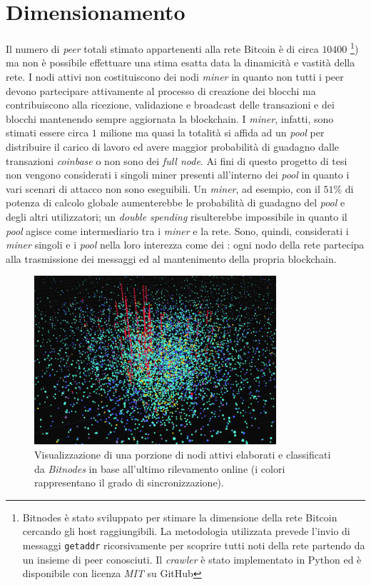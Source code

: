 \section{Dimensionamento}
Il numero di \textit{peer} totali stimato appartenenti alla rete Bitcoin è di circa $10400$ \cite{bitnodes}\footnote{Bitnodes è stato sviluppato per stimare la dimensione della rete Bitcoin cercando gli host raggiungibili. La metodologia utilizzata prevede l'invio di messaggi \texttt{getaddr} ricorsivamente per scoprire tutti noti della rete partendo da un insieme di peer conosciuti. Il \textit{crawler} è stato implementato in Python ed è disponibile con licenza \textit{MIT} su GitHub}) ma non è possibile effettuare una stima esatta data la dinamicità e vastità della rete. I nodi attivi non costituiscono dei nodi \textit{miner} in quanto non tutti i peer devono partecipare attivamente al processo di creazione dei blocchi ma contribuiscono alla ricezione, validazione e broadcast delle transazioni e dei blocchi mantenendo sempre aggiornata la blockchain. I \textit{miner}, infatti, sono stimati essere circa $1$ milione ma quasi la totalità si affida ad un \textit{pool} per distribuire il carico di lavoro ed avere maggior probabilità di guadagno dalle transazioni \textit{coinbase} o non sono dei \textit{full node}.\newline
Ai fini di questo progetto di tesi non vengono considerati i singoli miner presenti all'interno dei \textit{pool} in quanto i vari scenari di attacco non sono eseguibili. Un \textit{miner}, ad esempio, con il $51\%$ di potenza di calcolo globale aumenterebbe le probabilità di guadagno del \textit{pool} e degli altri utilizzatori; un \textit{double spending} risulterebbe impossibile in quanto il \textit{pool} agisce come intermediario tra i \textit{miner} e la rete.\newline
Sono, quindi, considerati i \textit{miner} singoli e i \textit{pool} nella loro interezza come dei : ogni nodo della rete partecipa alla trasmissione dei messaggi ed al mantenimento della propria blockchain.
\begin{figure}[H]
    \centering
    \includegraphics[width=0.8\textwidth]{images/bitnodes.png}
    \caption{Visualizzazione di una porzione di nodi attivi elaborati e classificati da \textit{Bitnodes} in base all'ultimo rilevamento online (i colori rappresentano il grado di sincronizzazione).}
\end{figure}

